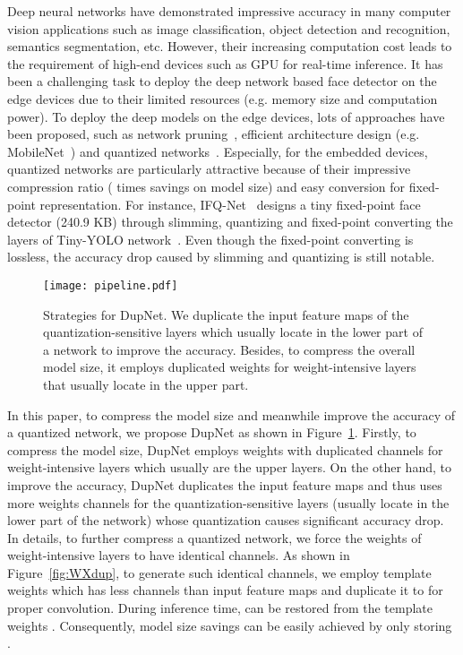 \documentclass[10pt,twocolumn,letterpaper]{article}
\begin{document}
Deep neural networks have demonstrated impressive accuracy in many computer vision applications such as image classification, object detection and recognition, semantics segmentation, etc. However, their increasing computation cost leads to the requirement of high-end devices such as GPU for real-time inference. It has been a challenging task to deploy the deep network based face detector on the edge devices due to their limited resources (e.g. memory size and computation power). To deploy the deep models on the edge devices, lots of approaches have been proposed, such as network pruning~\cite{Prun1,Prun2}, efficient architecture design (e.g. MobileNet~\cite{MobileNetv1,MobileNetv2}) and quantized networks~\cite{XNOR,HWGQ}. Especially, for the embedded devices, quantized networks are particularly attractive because of their impressive compression ratio ( times savings on model size) and easy conversion for fixed-point representation. For instance, IFQ-Net~\cite{IFQNet} designs a tiny fixed-point face detector (240.9 KB) through slimming, quantizing and fixed-point converting the layers of Tiny-YOLO network~\cite{TinyYOLO}. Even though the fixed-point converting is lossless,  the accuracy drop caused by slimming and quantizing is still notable.

\begin{figure}[t]
	\begin{center}
		\texttt{[image: pipeline.pdf]}
	\end{center}
	\caption{Strategies for DupNet. We duplicate the input feature maps of the  quantization-sensitive layers which usually locate in the lower part of a network to improve the accuracy. Besides, to compress the overall model size, it employs duplicated weights for weight-intensive layers that usually locate in the upper part.}
	\label{fig:pipeline}
\end{figure}



In this paper, to compress the model size and meanwhile improve the accuracy of a quantized network, we propose DupNet as shown in Figure~\ref{fig:pipeline}. Firstly, to compress the model size, DupNet employs weights with duplicated channels for weight-intensive layers which usually are the upper layers. On the other hand, to improve the accuracy, DupNet duplicates the input feature maps and thus uses more weights channels for the quantization-sensitive layers (usually locate in the lower part of the network) whose quantization causes significant accuracy drop. In details, to further compress a quantized network, we force the weights of weight-intensive layers to have identical channels. As shown in Figure~\ref{fig:WXdup}, to generate such identical channels,  we employ template weights   which has less channels than input feature maps and duplicate it to  for proper convolution. During inference time,   can be restored from the template weights . Consequently, model size savings can be easily achieved by only storing .
\end{document}

